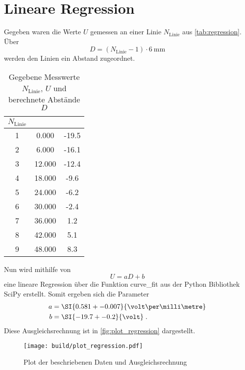 \section{Lineare Regression}
\label{sec:Regression}

Gegeben waren die Werte $U$ gemessen an einer Linie $N_\text{Linie}$ aus \autoref{tab:regression}. 
Über 
\begin{equation}
    D = (N_\text{Linie}-1) \cdot \SI{6}{\milli\metre}
\end{equation}
werden den Linien ein Abstand zugeordnet.

\begin{table}
    \centering
    \begin{tabular}{S S S}
        \toprule
        {$N_\text{Linie}$} &  &  \\
         & 0.000 & -19.5 \\
        2 & 6.000 & -16.1 \\
        3 & 12.000 & -12.4 \\
        4 & 18.000 & -9.6 \\
        5 & 24.000 & -6.2 \\
        6 & 30.000 & -2.4 \\
        7 & 36.000 & 1.2 \\
        8 & 42.000 & 5.1 \\
        9 & 48.000 & 8.3 \\
        \bottomrule
    \end{tabular}
    \caption{Gegebene Messwerte $N_\text{Linie}$, $U$ und berechnete Abstände $D$}
\end{table}

Nun wird mithilfe von
\begin{equation}
    U = a D + b
\end{equation}
eine lineare Regression über die Funktion curve\_fit aus der Python Bibliothek SciPy erstellt.
Somit ergeben sich die Parameter
\begin{align}
    a &= \SI{0.581+-0.007}{\volt\per\milli\metre} \\
    b &= \SI{-19.7+-0.2}{\volt} \; .
\end{align}
Diese Ausgleichsrechnung ist in \autoref{fig:plot_regression} dargestellt.

\begin{figure}[]
    \centering
    \texttt{[image: build/plot\_regression.pdf]}
    \caption{Plot der beschriebenen Daten und Ausgleichsrechnung}
    \label{fig:plot_regression}
\end{figure}